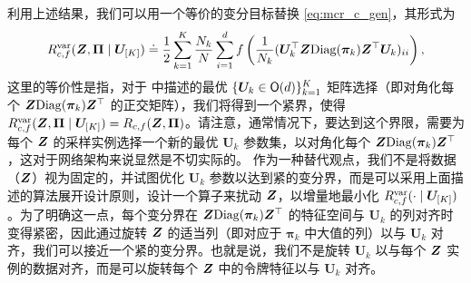 \documentclass[../../book-main.tex]{subfiles}
\begin{document}
利用上述结果，我们可以用一个等价的变分目标替换 \eqref{eq:mcr_c_gen}，其形式为
\vspace{-2mm}
\begin{equation}
    \label{eq:var_comp}
    R^{\rm var}_{c,f} (\bm{Z},\bm \Pi \mid \bm U_{[K]}) \doteq \frac{1}{2}\sum_{k=1}^K \frac{N_k}{N} \sum_{i=1}^{d} f\left(\frac{1}{N_k} (\bm U_{k}^{\top} \bm{Z} \mathrm{Diag}(\bm \pi_k) \bm Z^{\top} \bm U_{k})_{ii} \right),
\end{equation}
这里的等价性是指，对于  中描述的最优 $\{ \bm U_k \in \mathsf{O}(d)\}_{k=1}^K$ 矩阵选择（即对角化每个 $\bm{Z} \mathrm{Diag}(\bm \pi_k) \bm{Z}^\top $ 的正交矩阵），我们将得到一个紧界，使得 $ R^{\rm var}_{c,f} (\bm{Z},\bm \Pi \mid \bm U_{[K]}) = R_{c,f} (\bm{Z},\bm \Pi)$。请注意，通常情况下，要达到这个界限，需要为每个 $\bm{Z}$ 的采样实例选择一个新的最优 $\bm U_{k}$ 参数集，以对角化每个 $\bm{Z}\mathrm{Diag}(\bm \pi_{k})\bm{Z}^{\top}$，这对于网络架构来说显然是不切实际的。
作为一种替代观点，我们不是将数据（$\bm{Z}$）视为固定的，并试图优化 $\bm U_k$ 参数以达到紧的变分界，而是可以采用上面描述的算法展开设计原则，设计一个算子来扰动 $\bm{Z}$，以增量地最小化 $R_{c, f}^{\rm var}(\cdot \mid \bm U_{[K]})$。为了明确这一点，每个变分界在 $\bm{Z} \mathrm{Diag}(\bm \pi_k) \bm{Z}^\top$ 的特征空间与 $\bm U_k$ 的列对齐时变得紧密，因此通过旋转 $\bm{Z}$ 的适当列（即对应于 $\bm \pi_k$ 中大值的列）以与 $\bm U_k$ 对齐，我们可以接近一个紧的变分界。也就是说，我们不是旋转 $\bm U_k$ 以与每个 $\bm{Z}$ 实例的数据对齐，而是可以旋转每个 $\bm{Z}$ 中的令牌特征以与 $\bm U_k$ 对齐。
\end{document}
